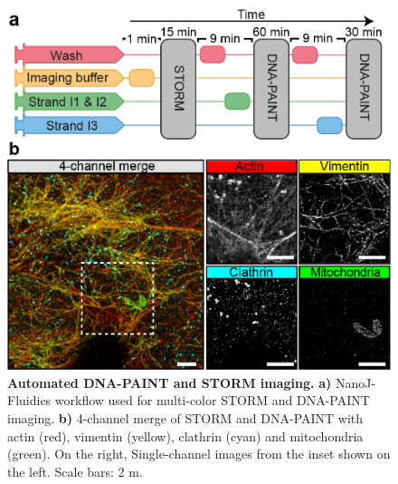  \begin{figure}[!t]
    \centering
    \includegraphics{Figures/FigurePumpy_v3.png}
    \caption{\textbf{Automated DNA-PAINT and STORM imaging.} \textbf{a)} NanoJ-Fluidics workflow used for multi-color STORM and DNA-PAINT imaging. \textbf{b)} 4-channel merge of STORM and DNA-PAINT with actin (red), vimentin (yellow), clathrin (cyan) and mitochondria (green). On the right, Single-channel images from the inset shown on the left. Scale bars: 2 \textmu{}m.}
    \label{fig:PAINT}
 \end{figure}


